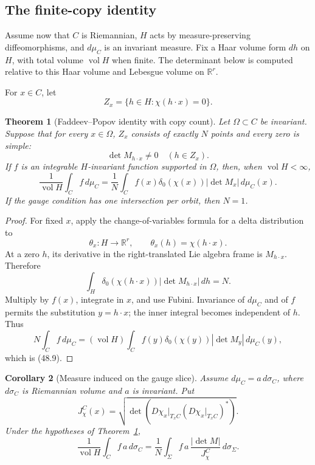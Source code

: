 \documentclass[11pt]{article}
\newtheorem{theorem}{Theorem}[section]
\newtheorem{corollary}[theorem]{Corollary}
\begin{document}
\subsection{The finite-copy identity}

Assume now that \(C\) is Riemannian, \(H\) acts by measure-preserving
diffeomorphisms, and \(d\mu_C\) is an invariant measure.  Fix a Haar
volume form \(dh\) on \(H\), with total volume
\(\operatorname{vol}H\) when finite.  The determinant below is computed
relative to this Haar volume and Lebesgue volume on \(\mathbb R^r\).

For \(x\in C\), let
\[
 Z_x=\{h\in H:\chi(h\cdot x)=0\}.                              \tag{48.7}
\]

\begin{theorem}[Faddeev--Popov identity with copy count]
\label{thm:v11v48-fp}
Let \(\Omega\subset C\) be invariant.  Suppose that for every
\(x\in\Omega\), \(Z_x\) consists of exactly \(N\) points and every
zero is simple:
\[
                      \det M_{h\cdot x}\ne0\quad(h\in Z_x).    \tag{48.8}
\]
If \(f\) is an integrable \(H\)-invariant function supported in
\(\Omega\), then, when \(\operatorname{vol}H<\infty\),
\[
 \frac1{\operatorname{vol}H}\int_C f\,d\mu_C
 =\frac1N\int_C f(x)\delta_0(\chi(x))
                  |\det M_x|\,d\mu_C(x).                      \tag{48.9}
\]
If the gauge condition has one intersection per orbit, then \(N=1\).
\end{theorem}

\begin{proof}
For fixed \(x\), apply the change-of-variables formula for a delta
distribution to
\[
                  \theta_x:H\to\mathbb R^r,\qquad
                  \theta_x(h)=\chi(h\cdot x).
\]
At a zero \(h\), its derivative in the right-translated Lie algebra
frame is \(M_{h\cdot x}\).  Therefore
\[
 \int_H\delta_0(\chi(h\cdot x))|\det M_{h\cdot x}|\,dh=N.      \tag{48.10}
\]
Multiply by \(f(x)\), integrate in \(x\), and use Fubini.  Invariance
of \(d\mu_C\) and of \(f\) permits the substitution \(y=h\cdot x\);
the inner integral becomes independent of \(h\).  Thus
\[
 N\int_C f\,d\mu_C
 =(\operatorname{vol}H)\int_C f(y)\delta_0(\chi(y))
                         |\det M_y|\,d\mu_C(y),
\]
which is (48.9).
\end{proof}

\begin{corollary}[Measure induced on the gauge slice]
\label{cor:v11v48-slice-measure}
Assume \(d\mu_C=a\,d\sigma_C\), where \(d\sigma_C\) is Riemannian
volume and \(a\) is invariant.  Put
\[
 J_\chi^C(x)=
 \sqrt{\det\!\left(D\chi_x|_{T_xC}
             (D\chi_x|_{T_xC})^*\right)}.                     \tag{48.11}
\]
Under the hypotheses of Theorem~\ref{thm:v11v48-fp},
\[
 \frac1{\operatorname{vol}H}\int_C f\,a\,d\sigma_C
 =\frac1N\int_\Sigma
      f\,a\,\frac{|\det M|}{J_\chi^C}\,d\sigma_\Sigma.         \tag{48.12}
\]
\end{corollary}
\end{document}
